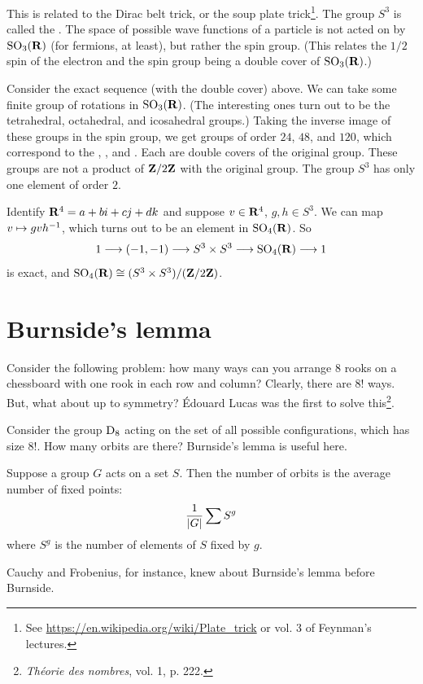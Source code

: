 \documentclass[11pt, oneside]{amsart}
\begin{document}
This is related to the Dirac belt trick, or the soup plate trick\footnote{See \url{https://en.wikipedia.org/wiki/Plate_trick} or vol. $3$ of Feynman's lectures.}. %
The group $S^3$ is called the . The space of possible wave functions of a particle is not acted on by $\operatorname{SO}_3(\mathbf R)$ (for fermions, at least), but rather the spin group. (This relates the $1/2$ spin of the electron and the spin group being a double cover of $\operatorname{SO}_3(\mathbf R)$.) 

Consider the exact sequence (with the double cover) above. We can take some finite group of rotations in $\operatorname{SO}_3(\mathbf R)$. (The interesting ones turn out to be the tetrahedral, octahedral, and icosahedral groups.) Taking the inverse image of these groups in the spin group, we get groups of order $24$, $48$, and $120$, which correspond to the , , and . Each are double covers of the original group. These groups are not a product of $\mathbf Z/2\mathbf Z$ with the original group. The group $S^3$ has only one element of order $2$.

Identify $\mathbf R^4 = a + bi + cj + dk$ and suppose $v\in \mathbf R^4$, $g,h\in S^3$. We can map $v\mapsto gvh^{-1}$, which turns out to be an element in $\operatorname{SO}_4(\mathbf R)$. So  
$$
1\longrightarrow (-1,-1)\longrightarrow S^3 \times S^3 \longrightarrow \operatorname{SO}_4(\mathbf R) \longrightarrow 1
$$
is exact, and $\operatorname{SO}_4(\mathbf R) \cong (S^3 \times S^3)/(\mathbf Z/2\mathbf Z)$.

\section{Burnside's lemma}
Consider the following problem: how many ways can you arrange $8$ rooks on a chessboard with one rook in each row and column? Clearly, there are $8!$ ways. But, what about up to symmetry? \'Edouard Lucas was the first to solve this\footnote{\textit{Théorie des nombres}, vol. 1, p. 222.}.

Consider the group $\operatorname{D}_8$ acting on the set of all possible configurations, which has size $8!$. How many orbits are there? Burnside's lemma is useful here.
\begin{lemma}[Burnside]
Suppose a group $G$ acts on a set $S$. Then the number of orbits is the average number of fixed points: 
$$
\frac{1}{\left \lvert G \right \rvert} \sum S^g
$$
where $S^g$ is the number of elements of $S$ fixed by $g$.
\end{lemma}

Cauchy and Frobenius, for instance, knew about Burnside's lemma before Burnside.
\end{document}
